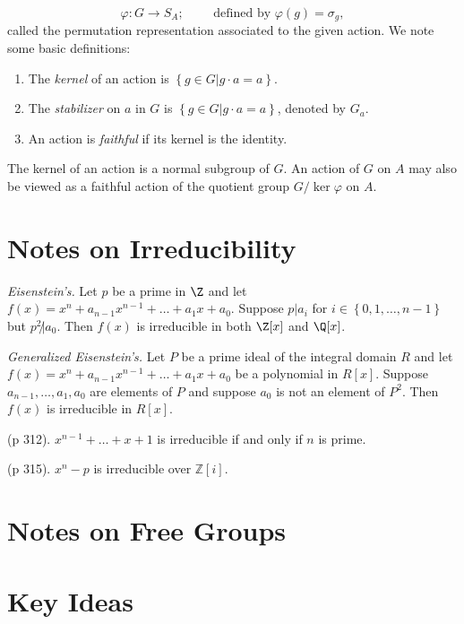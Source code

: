 \documentclass[12pt]{article}
\def\ZZ{\mathbb{Z}}
\begin{document}
  \[
    \varphi: G \to S_A; \qquad \text{ defined by } \varphi(g) = \sigma_g,
  \]
  called the permutation representation associated to the given action.  We note some basic definitions:

  \begin{enumerate}
    \item The {\it kernel} of an action is $\left\{ g \in G | g \cdot a = a \right\}$.
    \item The {\it stabilizer} on $a$ in $G$ is $\left\{ g \in G | g \cdot a = a \right\}$, denoted by $G_a$.
    \item An action is {\it faithful} if its kernel is the identity.
  \end{enumerate}

  The kernel of an action is a normal subgroup of $G$.  An action of $G$ on $A$ may also be viewed as a faithful action of the quotient group $G / \ker \varphi$ on $A$.

  \section{Notes on Irreducibility}

  {\it Eisenstein's.} Let $p$ be a prime in $\Z$ and let $f(x) = x^n + a_{n-1} x^{n-1} + \dots + a_1 x + a_0$.  Suppose $p | a_i$ for $i \in \left\{ 0, 1, \dots, n-1 \right\}$ but $p^2 \not | a_0$.  Then $f(x)$ is irreducible in both $\Z[x]$ and $\Q[x]$.

  {\it Generalized Eisenstein's.}  Let $P$ be a prime ideal of the integral domain $R$ and let $f(x) = x^n + a_{n-1} x^{n-1} + \dots + a_1 x + a_0$ be a polynomial in $R[x]$.  Suppose $a_{n-1}, \dots, a_1, a_0$ are elements of $P$ and suppose $a_0$ is not an element of $P^2$.  Then $f(x)$ is irreducible in $R[x]$.

  (p 312).  $x^{n-1} + \dots + x + 1$ is irreducible if and only if $n$ is prime. 

  (p 315). $x^n - p$ is irreducible over $\ZZ[i]$.


  \section{Notes on Free Groups}







\section{Key Ideas}
\end{document}

